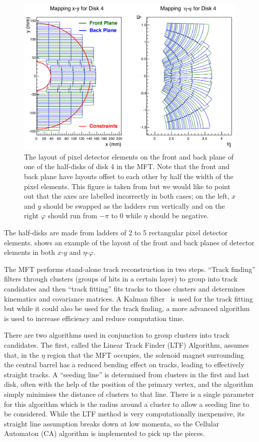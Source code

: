 \begin{figure}[h]
    \begin{center}
        \includegraphics[width=.8\textwidth]{Figs/MFT_Disk4_mapping.png}
        \caption[Pixel detector layout on the front and back plane of half-disk 4]{The layout of pixel detector elements on the front and back plane of one of the half-disks of disk 4 in the MFT. Note that the front and back plane have layouts offset to each other by half the width of the pixel elements. This figure is taken from \cite[fig.~6.1]{MFT_TDR} but we would like to point out that the axes are labelled incorrectly in both cases; on the left, $x$ and $y$ should be swapped as the ladders run vertically and on the right $\varphi$ should run from $-\pi$ to 0 while $\eta$ should be negative.}
        \label{fig:MFT_Disk4_mapping}
    \end{center}
\end{figure}

The half-disks are made from ladders of 2 to 5 rectangular pixel detector elements.  shows an example of the layout of the front and back planes of detector elements in both $x$-$y$ and $\eta$-$\varphi$. 

The MFT performs stand-alone track reconstruction in two steps. ``Track finding'' filters through clusters (groups of hits in a certain layer) to group into track candidates and then ``track fitting'' fits tracks to those clusters and determines kinematics and covariance matrices. A Kalman filter~\cite{Kalman} is used for the track fitting but while it could also be used for the track finding, a more advanced algorithm is used to increase efficiency and reduce computation time. 

There are two algorithms used in conjunction to group clusters into track candidates. The first, called the Linear Track Finder (LTF) Algorithm, assumes that, in the $\eta$ region that the MFT occupies, the solenoid magnet surrounding the central barrel has a reduced bending effect on tracks, leading to effectively straight tracks. A ``seeding line'' is determined from clusters in the first and last disk, often with the help of the position of the primary vertex, and the algorithm simply minimises the distance of clusters to that line. There is a single parameter for this algorithm which is the radius around a cluster to allow a seeding line to be considered. While the LTF method is very computationally inexpensive, its straight line assumption breaks down at low momenta, so the Cellular Automaton (CA) algorithm is implemented to pick up the pieces.


